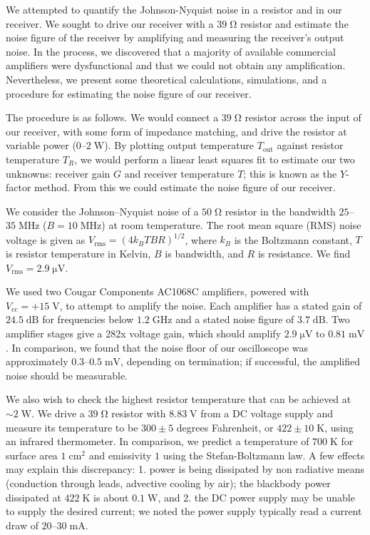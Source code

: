 \documentclass[11pt]{article}
\newcommand {\mt}{\mathrm}
\newcommand {\unit}[1]{\; \mt{#1}}
\begin{document}
We attempted to quantify the Johnson-Nyquist noise in a resistor and in our
receiver.  We sought to drive our receiver with a $39 \unit{\Omega}$ resistor
and estimate the noise figure of the receiver by amplifying and measuring the
receiver's output noise.  In the process, we discovered that a majority of
available commercial amplifiers were dysfunctional and that we could not obtain
any amplification.  Nevertheless, we present some theoretical calculations,
simulations, and a procedure for estimating the noise figure of our receiver.

The procedure is as follows.  We would connect a $39 \unit{\Omega}$ resistor
across the input of our receiver, with some form of impedance matching, and
drive the resistor at variable power ($0$--$2 \unit{W}$). By plotting output
temperature $T_{\mt{out}}$ against resistor temperature $T_R$, we would perform
a linear least squares fit to estimate our two unknowns: receiver gain $G$ and
receiver temperature $T$; this is known as the $Y$-factor method.  From this we
could estimate the noise figure of our receiver.

We consider the Johnson--Nyquist noise of a $50 \unit{\Omega}$ resistor in the
bandwidth $25$--$35 \unit{MHz}$ ($B = 10 \unit{MHz}$) at room temperature.  The
root mean square (RMS) noise voltage is given as $V_{\mt{rms}} =
(4k_B T B R)^{1/2}$, where $k_B$ is the Boltzmann constant, $T$ is resistor
temperature in Kelvin, $B$ is bandwidth, and $R$ is resistance.  We find
$V_{\mt{rms}} = 2.9 \unit{\mu V}$.

We used two Cougar Components AC1068C amplifiers, powered with $V_{\mt{cc}} =
+15 \unit{V}$, to attempt to amplify the noise.  Each amplifier has a stated
gain of $24.5 \unit{dB}$ for frequencies below $1.2 \unit{GHz}$ and a stated
noise figure of $3.7 \unit{dB}$.  Two amplifier stages give a 282x voltage
gain, which should amplify $2.9 \unit{\mu V}$ to $0.81 \unit{mV}$.  In
comparison, we found that the noise floor of our oscilloscope was approximately
$0.3$--$0.5 \unit{mV}$, depending on termination; if successful, the amplified
noise should be measurable.

We also wish to check the highest resistor temperature that can be achieved at
$\sim 2 \unit{W}$.  We drive a $39 \unit{\Omega}$ resistor with $8.83 \unit{V}$
from a DC voltage supply and measure its temperature to be $300 \pm 5$ degrees
Fahrenheit, or $422 \pm 10 \unit{K}$, using an infrared thermometer.  In
comparison, we predict a temperature of $700 \unit{K}$ for surface area $1
\unit{cm^2}$ and emissivity $1$ using the Stefan-Boltzmann law.  A few effects
may explain this discrepancy: 1. power is being dissipated by non radiative
means (conduction through leads, advective cooling by air); the blackbody power
dissipated at $422 \unit{K}$ is about $0.1 \unit{W}$, and 2. the DC power
supply may be unable to supply the desired current; we noted the power
supply typically read a current draw of $20$--$30 \unit{mA}$.
\end{document}
